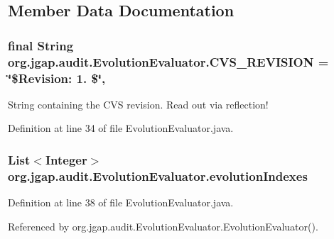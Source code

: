 \subsection{Member Data Documentation}
\hypertarget{classorg_1_1jgap_1_1audit_1_1_evolution_evaluator_a3bcd75b9231b782f81ed96c2cc1dd9ef}{
\subsubsection[{C\-V\-S\-\_\-\-R\-E\-V\-I\-S\-I\-O\-N}]{\setlength{\rightskip}{0pt plus 5cm}final String org.\-jgap.\-audit.\-Evolution\-Evaluator.\-C\-V\-S\-\_\-\-R\-E\-V\-I\-S\-I\-O\-N = \char`\"{}\$Revision\-: 1. \$\char`\"{}\hspace{0.3cm}{\ttfamily [static]}, {\ttfamily [private]}}}\label{classorg_1_1jgap_1_1audit_1_1_evolution_evaluator_a3bcd75b9231b782f81ed96c2cc1dd9ef}
String containing the C\-V\-S revision. Read out via reflection! 

Definition at line 34 of file Evolution\-Evaluator.\-java.

\hypertarget{classorg_1_1jgap_1_1audit_1_1_evolution_evaluator_accd4f76386641576b80ad5f2c6e94a10}{
\subsubsection[{evolution\-Indexes}]{\setlength{\rightskip}{0pt plus 5cm}List$<$Integer$>$ org.\-jgap.\-audit.\-Evolution\-Evaluator.\-evolution\-Indexes\hspace{0.3cm}{\ttfamily [private]}}}\label{classorg_1_1jgap_1_1audit_1_1_evolution_evaluator_accd4f76386641576b80ad5f2c6e94a10}


Definition at line 38 of file Evolution\-Evaluator.\-java.



Referenced by org.\-jgap.\-audit.\-Evolution\-Evaluator.\-Evolution\-Evaluator().

